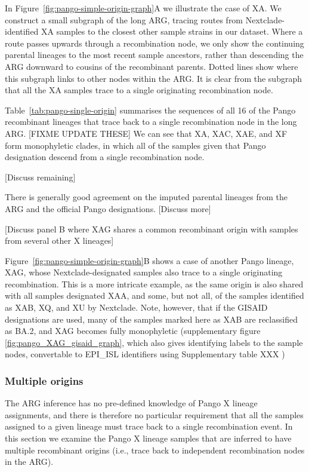 \documentclass{article}
\begin{document}
In Figure~\ref{fig:pango-simple-origin-graph}A we illustrate the case of XA. We construct a small subgraph of the long ARG, tracing routes from Nextclade-identified XA samples to the closest other sample strains in our dataset. Where a route passes upwards through a recombination node, we only show the continuing parental lineages to the most recent sample ancestors, rather than descending the ARG downward to cousins of the recombinant parents. Dotted lines show where this subgraph links to other nodes within the ARG. It is clear from the subgraph that all the XA samples trace to a single originating recombination node.

Table~\ref{tab:pango-single-origin} summarises the sequences of all 16 of the
Pango recombinant lineages that trace back to a single recombination node in
the long ARG. [FIXME UPDATE THESE] We can see that XA, XAC, XAE, and XF form
monophyletic clades, in which all of the samples given that Pango designation
descend from a single recombination node.

[Discuss remaining]

There is generally good agreement on the imputed parental lineages from the ARG
and the official Pango designations. [Discuss more]

[Discuss panel B where XAG shares a common recombinant origin with samples from
several other X lineages]

Figure~\ref{fig:pango-simple-origin-graph}B shows a case of another
Pango lineage, XAG, whose Nextclade-designated samples also trace to a
single originating recombination. This is a more intricate example, as the same origin
is also shared with all samples designated XAA, and some, but not all, of the
samples identified as XAB, XQ, and XU by Nextclade. Note, however, that if the GISAID
designations are used, many of the samples marked here as XAB are reclassified
as BA.2, and XAG becomes fully monophyletic (supplementary figure
\ref{fig:pango_XAG_gisaid_graph}, which also gives identifying labels to the
sample nodes, convertable to EPI\_ISL identifiers using
Supplementary table XXX )

\subsubsection{Multiple origins}
The ARG inference has no pre-defined knowledge
of Pango X lineage assignments, and there is therefore no particular
requirement that all the samples assigned to a given lineage must trace back to
a single recombination event. In this section we examine the Pango X lineage
samples that are inferred to have multiple recombinant origins (i.e., trace
back to independent recombination nodes in the ARG).
\end{document}
